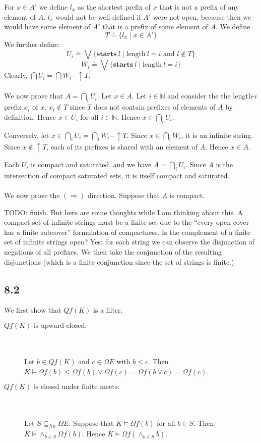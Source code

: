 \documentclass{article}
\newcommand{\mbf}{\mathbf}
\begin{document}
For $x \in A'$ we define $l_x$ as the shortest prefix of $x$ that is not a prefix of any element of $A$. $l_x$ would not be well defined if $A'$ were not open, because then we would have some element of $A'$ that is a prefix of some element of $A$. We define
$$T \doteq \{ l_x \mid x \in A' \}$$
We further define:
$$U_i \doteq \bigvee \{ \mbf{starts}~l \mid \text{length}~l = i \text{ and } l \not \in T \} $$
$$W_i \doteq  \bigvee \{ \mbf{starts}~l \mid \text{length}~l = i \}$$
Clearly, $\bigcap U_i = \bigcap W_i - \uparrow T$.\\~\\
We now prove that $A = \bigcap_{i} U_i$. Let $x \in A$. Let $i \in \mathbb N$ and consider the the length-$i$ prefix $x_i$ of $x$. $x_i \not \in T$ since $T$ does not contain prefixes of elements of $A$ by definition. Hence $x \in U_i$ for all $i \in \mathbb N$. Hence $x \in \bigcap_{i} U_i$.

Conversely, let $x \in \bigcap_i U_i = \bigcap_i W_i - \uparrow T$. Since $x \in \bigcap_i W_i$, it is an infinite string. Since $x \not \in \uparrow T$, each of its prefixes is shared with an element of $A$. Hence $x \in A$.

Each $U_i$ is compact and saturated, and we have $A = \bigcap_{i} U_i$. Since $A$ is the intersection of compact saturated sets,
it is itself compact and saturated. \\~\\
We now prove the $(\Rightarrow)$ direction. Suppose that $A$ is compact.

TODO: finish. But here are some thoughts while I am thinking about this. A compact set of infinite strings must be a finite set due to the ``every open cover has a finite subcover'' formulation of compactness. Is the complement of a finite set of infinite strings open? Yes: for each string we can observe the disjunction of negations of all prefixes. We then take the conjunction of the resulting disjunctions (which is a finite conjunction since the set of strings is finite.)

\subsection*{8.2}

We first show that $Qf(K)$ is a filter.

\begin{description}

\item[$Qf(K)\text{ is upward closed}:$]~\\~\\
Let $b \in Qf(K)$ and $c \in \Omega E$ with $b \leq c$. Then $K \vDash \Omega f(b) \leq \Omega f (b) \vee \Omega f (c) = \Omega f(b \vee c) = \Omega f(c)$.

\item[$Qf(K)\text{ is closed under finite meets}:$]~\\~\\
Let $S \subseteq_{\mathit{fin}} \Omega E$. Suppose that $K \vDash \Omega f(b)$ for all $b \in S$. Then $K \vDash \wedge_{b \in S} \Omega f(b)$.
Hence $K \vDash \Omega f(\wedge_{b \in S} b)$.
  
\end{description}
\end{document}
